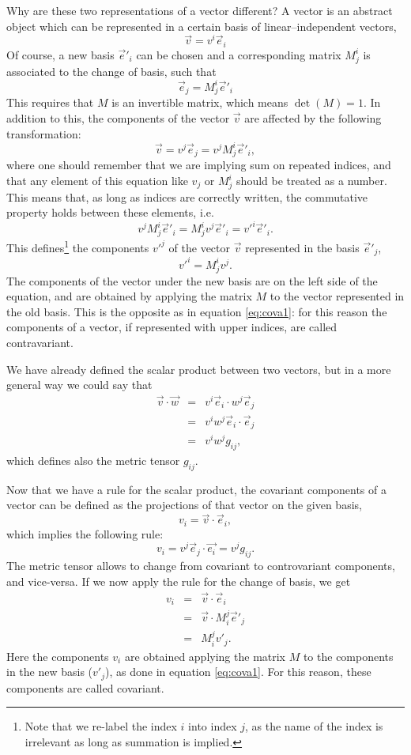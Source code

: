 Why are these two representations of a vector different? A vector is an abstract object which can be
represented in a certain basis of linear--independent vectors,
\[\vec{v} = v^i \vec{e}_i\]
Of course, a new basis ${\vec{e}'_i}$ can be chosen and a
corresponding matrix $M^i_j$ is associated to the change of basis,
such that
\begin{equation}
  \label{eq:cova1}
  \vec{e}_j = M^i_j \vec{e}'_i
\end{equation}
This requires that $M$ is an invertible matrix, which means $\det(M) = 1$. In
addition to this, the components of the vector $\vec{v}$ are affected
by the following transformation:
\[\vec{v} = v^j \vec{e}_j = v^j M^i_j \vec{e}'_i,\]
where one should remember that we are implying sum on repeated indices, and that any element of
this equation like $v_j$ or $M^i_j$ should be treated as a
number. This means that, as long as indices are correctly written, the
commutative property holds between these elements, i.e.
\[v^j M^i_j \vec{e}'_i = M^i_j v^j \vec{e}'_i = v'^i \vec{e}'_i.\] This
defines\footnote{Note that we re-label the index $i$ into index $j$, as the name of the index is irrelevant as long as summation is implied.} the components $v'^j$ of the vector $\vec{v}$ represented in
the basis ${\vec{e}'_j}$,
\[v'^i = M^i_j v^j.\] The components of the vector under the new
basis are on the left side of the equation, and are obtained by
applying the matrix $M$ to the vector represented in the old
basis. This is the opposite as in equation \eqref{eq:cova1}: for this
reason the components of a vector, if represented with upper indices,
are called contravariant.

We have already defined the scalar product between two vectors, but in
a more general way we could say that
\begin{eqnarray*}
  \vec{v}\cdot\vec{w} &=& v^i\vec{e}_i \cdot w^j \vec{e}_j \\
                      &=& v^i w^j \vec{e}_i \cdot \vec{e}_j\\
                      &=& v^i w^j g_{ij},
\end{eqnarray*}
which defines also the metric tensor $g_{ij}$.

Now that we have a rule for the scalar product, the covariant
components of a vector can be defined as the projections of that
vector on the given basis,
\[v_i = \vec{v} \cdot \vec{e}_i, \] which implies the following rule:
\[v_i = v^j \vec{e}_j\cdot\vec{e_i} = v^j g_{ij}.\] The metric tensor
allows to change from covariant to controvariant components, and vice-versa.  If we
now apply the rule for the change of basis, we get
\begin{eqnarray*}
  v_i &=& \vec{v}\cdot\vec{e}_i\\
      &=& \vec{v}\cdot M^j_i \vec{e}'_j\\
      &=& M^j_i v'_j.
\end{eqnarray*}
Here the components $v_i$ are obtained applying the matrix $M$ to the
components in the new basis ($v'_j$), as done in equation
\eqref{eq:cova1}. For this reason, these components are called covariant.

